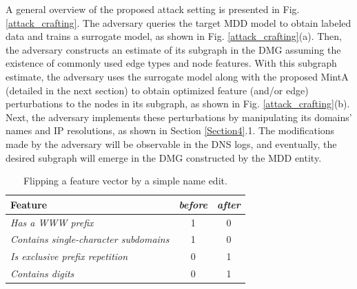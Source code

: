 \documentclass[conference,compsoc]{IEEEtran}
\begin{document}
\par A general overview of the proposed attack setting is presented in Fig. \ref{attack_crafting}. The adversary queries the target MDD model to obtain labeled data and trains a surrogate model, as shown in Fig. \ref{attack_crafting}(a). Then, the adversary constructs an estimate of its subgraph in the DMG assuming the existence of commonly used edge types and node features. With this subgraph estimate, the adversary uses the surrogate model along with the proposed MintA (detailed in the next section) to obtain optimized feature (and/or edge) perturbations to the nodes in its subgraph, as shown in Fig. \ref{attack_crafting}(b). Next, the adversary implements these perturbations by manipulating its domains' names and IP resolutions, as shown in Section \ref{Section4}.1. The modifications made by the adversary will be observable in the DNS logs, and eventually, the desired subgraph will emerge in the DMG constructed by the MDD entity.

\begin{table}[!h]
\centering
\caption{Flipping a feature vector by a simple name edit.}
\begin{tabular}{|l|c|c|}
\hline
Feature & \textit{before} & \textit{after} \\\hline
\textit{Has a WWW prefix} & 1 & 0 \\\hline
\textit{Contains single-character subdomains} & 1 & 0 \\\hline
\textit{Is exclusive prefix repetition} & 0 & 1 \\\hline
\textit{Contains digits} & 0 & 1 \\\hline 
\end{tabular}
\label{table1}
\end{table}


\end{document}
